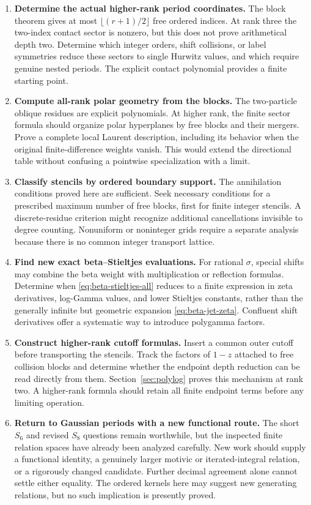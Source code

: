 \documentclass[11pt,a4paper]{article}
\numberwithin{equation}{section}
\theoremstyle{definition}
\theoremstyle{remark}
\begin{document}
\begin{enumerate}[label=\textbf{\arabic*.},leftmargin=*]
\item \textbf{Determine the actual higher-rank period coordinates.}
The block theorem gives at most
$\lfloor(r+1)/2\rfloor$ free ordered indices. At rank three the
two-index contact sector is nonzero, but this does not prove
arithmetical depth two. Determine which integer orders, shift
collisions, or label symmetries reduce these sectors to single
Hurwitz values, and which require genuine nested periods.
The explicit contact polynomial provides a finite starting point.

\item \textbf{Compute all-rank polar geometry from the blocks.}
The two-particle oblique residues are explicit polynomials.
At higher rank, the finite sector formula should organize polar
hyperplanes by free blocks and their mergers. Prove a complete
local Laurent description, including its behavior when the original
finite-difference weights vanish. This would extend the directional
table without confusing a pointwise specialization with a limit.

\item \textbf{Classify stencils by ordered boundary support.}
The annihilation conditions proved here are sufficient. Seek
necessary conditions for a prescribed maximum number of free
blocks, first for finite integer stencils. A discrete-residue
criterion might recognize additional cancellations invisible to
degree counting. Nonuniform or noninteger grids require a separate
analysis because there is no common integer transport lattice.

\item \textbf{Find new exact beta--Stieltjes evaluations.}
For rational $\sigma$, special shifts may combine the beta weight
with multiplication or reflection formulas. Determine when
\eqref{eq:beta-stieltjes-all} reduces to a finite expression in
zeta derivatives, log-Gamma values, and lower Stieltjes constants,
rather than the generally infinite but geometric expansion
\eqref{eq:beta-jet-zeta}. Confluent shift derivatives offer a
systematic way to introduce polygamma factors.

\item \textbf{Construct higher-rank cutoff formulas.}
Insert a common outer cutoff before transporting the stencils.
Track the factors of $1-z$ attached to free collision blocks and
determine whether the endpoint depth reduction can be read directly
from them. Section~\ref{sec:polylog} proves this mechanism at rank
two. A higher-rank formula should retain all finite endpoint terms
before any limiting operation.

\item \textbf{Return to Gaussian periods with a new functional route.}
The short $S_6$ and revised $S_8$ questions remain worthwhile, but
the inspected finite relation spaces have already been analyzed
carefully. New work should supply a functional identity, a genuinely
larger motivic or iterated-integral relation, or a rigorously changed
candidate. Further decimal agreement alone cannot settle either
equality. The ordered kernels here may suggest new generating
relations, but no such implication is presently proved.
\end{enumerate}
\end{document}

